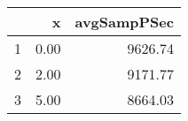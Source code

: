 \begin{table}[h]
\centering
\begin{tabular}{rrr}
  \hline
 & x & avgSampPSec \\ 
  \hline
1 & 0.00 & 9626.74 \\ 
   \hline
2 & 2.00 & 9171.77 \\ 
   \hline
3 & 5.00 & 8664.03 \\ 
   \hline
\end{tabular}
\end{table}
